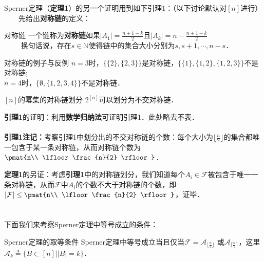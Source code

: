 Sperner定理（\textbf{定理1}）的另一个证明用到如下引理1：（以下讨论默认对$[n]$进行）\\
$\qquad$先给出\textbf{对称链}的定义：

\begin{definition}{对称链}
一个链称为\textbf{对称链}如果$|A_1|=\frac{n+1-k}{2}$且$|A_k|=n-\frac{n+1-k}{2}$\\
$\qquad$
换句话说，存在$s\in \mathbb{N}$使得链中的集合大小分别为$s,s+1,\cdots,n-s$．
\end{definition}

\begin{example}{对称链的例子与反例}
$n=3$时，$\{\{2\},\{2,3\}\}$是对称链，$\{\{1\},\{1,2\},\{1,2,3\}\}$不是对称链;\\
$n=4$时，$\{\emptyset,\{1,2,3,4\}\}$不是对称链．
\end{example}


\begin{lemma}{$[n]$的幂集的对称链划分}
$2^{[n]}$可以划分为不交对称链．
\end{lemma}

\textbf{引理1}的证明：利用\textbf{数学归纳法}可证明引理1．此处略去不表．\\\\
\textbf{引理1注记：}考察引理1中划分出的不交对称链的个数：每个大小为$\lfloor\frac{n}{2}\rfloor$的集合都唯一包含于某一条对称链，从而对称链个数为$\pmat{n\\ \lfloor\frac{n}{2} \rfloor}$．

\textbf{定理1}的另证：考虑\textbf{引理1}中的对称链划分，我们知道每个$A_i\in \mathcal{F}$被包含于唯一一条对称链，从而$\mathcal{F}$中$A_i$的个数不大于对称链的个数，即$|\mathcal{F}|\leq \pmat{n\\ \lfloor\frac{n}{2} \rfloor}$，证毕．\\
\\
\\
下面我们来考察Sperner定理中等号成立的条件：
\begin{theorem}{Sperner定理的取等条件}
Sperner定理中等号成立当且仅当$\mathcal{F}=\mathcal{A}_{\lfloor\frac{n}{2} \rfloor}$ 或$ \mathcal{A}_{\lceil\frac{n}{2} \rceil}$，这里$\mathcal{A}_k\triangleq\{B\subset[n]||B|=k\}$．
\end{theorem}


